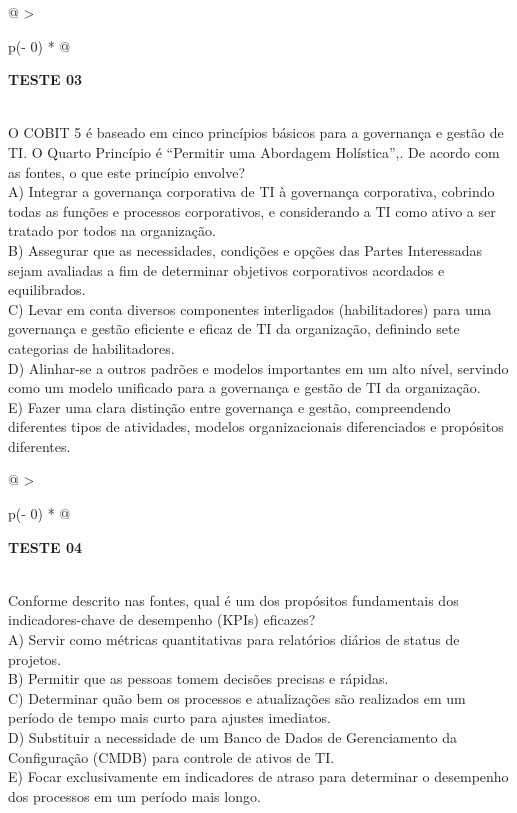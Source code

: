 \documentclass[
]{book}
\begin{document}
\begin{longtable}[]{@{}
  >{\raggedright\arraybackslash}p{(\columnwidth - 0\tabcolsep) * }@{}}
\toprule\noalign{}
\begin{minipage}[b]{\linewidth}\raggedright
\textbf{TESTE 03}
\end{minipage} \\
\midrule\noalign{}
\endhead
\bottomrule\noalign{}
\endlastfoot
O COBIT 5 é baseado em cinco princípios básicos para a governança e gestão de TI. O Quarto Princípio é ``Permitir uma Abordagem Holística'',. De acordo com as fontes, o que este princípio envolve? \\
A) Integrar a governança corporativa de TI à governança corporativa, cobrindo todas as funções e processos corporativos, e considerando a TI como ativo a ser tratado por todos na organização. \\
B) Assegurar que as necessidades, condições e opções das Partes Interessadas sejam avaliadas a fim de determinar objetivos corporativos acordados e equilibrados. \\
C) Levar em conta diversos componentes interligados (habilitadores) para uma governança e gestão eficiente e eficaz de TI da organização, definindo sete categorias de habilitadores. \\
D) Alinhar-se a outros padrões e modelos importantes em um alto nível, servindo como um modelo unificado para a governança e gestão de TI da organização. \\
E) Fazer uma clara distinção entre governança e gestão, compreendendo diferentes tipos de atividades, modelos organizacionais diferenciados e propósitos diferentes. \\
\end{longtable}

\begin{longtable}[]{@{}
  >{\raggedright\arraybackslash}p{(\columnwidth - 0\tabcolsep) * }@{}}
\toprule\noalign{}
\begin{minipage}[b]{\linewidth}\raggedright
\textbf{TESTE 04}
\end{minipage} \\
\midrule\noalign{}
\endhead
\bottomrule\noalign{}
\endlastfoot
Conforme descrito nas fontes, qual é um dos propósitos fundamentais dos indicadores-chave de desempenho (KPIs) eficazes? \\
A) Servir como métricas quantitativas para relatórios diários de status de projetos. \\
B) Permitir que as pessoas tomem decisões precisas e rápidas. \\
C) Determinar quão bem os processos e atualizações são realizados em um período de tempo mais curto para ajustes imediatos. \\
D) Substituir a necessidade de um Banco de Dados de Gerenciamento da Configuração (CMDB) para controle de ativos de TI. \\
E) Focar exclusivamente em indicadores de atraso para determinar o desempenho dos processos em um período mais longo. \\
\end{longtable}
\end{document}
